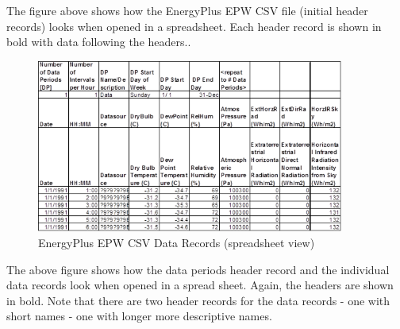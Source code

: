 The figure above shows how the EnergyPlus EPW CSV file (initial header records) looks when opened in a spreadsheet. Each header record is shown in bold with data following the headers..

\begin{figure}[hbtp] %
\centering
\includegraphics[width=0.9\textwidth, height=0.9\textheight, keepaspectratio=true]{media/image016.png}
\caption{EnergyPlus EPW CSV Data Records (spreadsheet view) \protect \label{fig:energyplus-epw-csv-data-records-spreadsheet}}
\end{figure}

The above figure shows how the data periods header record and the individual data records look when opened in a spread sheet. Again, the headers are shown in bold. Note that there are two header records for the data records - one with short names - one with longer more descriptive names.

